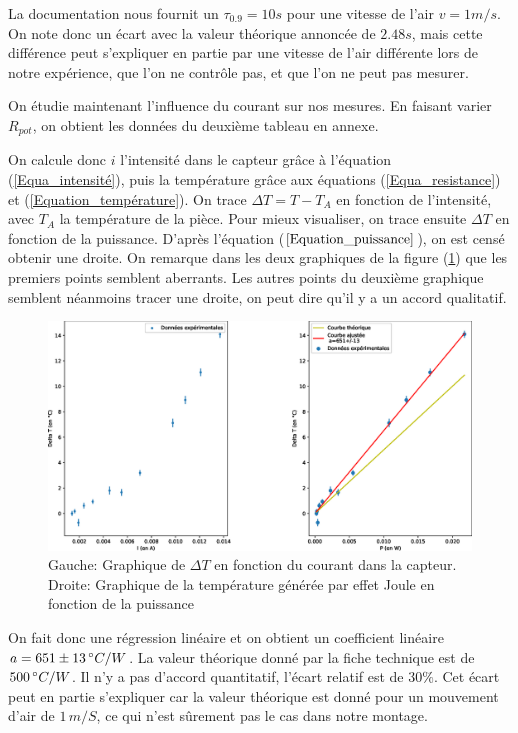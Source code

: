 \documentclass[12pt]{article}
\begin{document}
La documentation nous fournit un $\tau_{0.9} = 10s$ pour une vitesse de l'air $v = 1m/s$. On note donc un écart avec la valeur théorique annoncée de $2.48s$, mais cette différence peut s'expliquer en partie par 
une vitesse de l'air différente lors de notre expérience, que l'on ne contrôle pas, et que l'on ne peut pas mesurer. 

On étudie maintenant l'influence du courant sur nos mesures. En faisant varier $R_{pot}$, on obtient les données du deuxième tableau en annexe.


On calcule donc $i$ l'intensité dans le capteur grâce à l'équation (\ref{Equa_intensité}), puis la température grâce aux équations (\ref{Equa_resistance}) et (\ref{Equation_température}). On trace $\Delta T=T-T_A$ en fonction de l'intensité, avec $T_A$ la température de la pièce. Pour mieux visualiser, on trace ensuite $\Delta T$ en fonction de la puissance. D'après l'équation ($\ref{Equation_puissance}$), on est censé obtenir une droite. On remarque dans les deux graphiques de la figure (\ref{Graphe_puissance}) que les premiers points semblent aberrants. Les autres points du deuxième graphique semblent néanmoins tracer une droite, on peut dire qu'il y a un accord qualitatif.
\begin{figure}[h!]
	\begin{center}
		\includegraphics[scale=0.5]{Graphe2_puissance.eps}		
		\caption{Gauche: Graphique de $\Delta T$ en fonction du courant dans la capteur. Droite: Graphique de la température générée par effet Joule en fonction de la puissance}
		\label{Graphe_puissance}
	\end{center}
\end{figure}

 On fait donc une régression linéaire et on obtient  un coefficient linéaire $a=651\pm 13\, \degree C/W$. La valeur théorique donné par la fiche technique est de $500\, \degree C/W$. Il n'y a pas d'accord quantitatif, l'écart relatif est de $30\%$. Cet écart peut en partie s'expliquer car la valeur théorique est donné pour un mouvement d'air de $1\, m/S$, ce qui n'est sûrement pas le cas dans notre montage.
 
\end{document}
